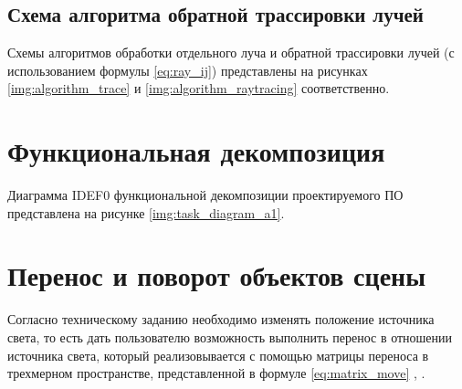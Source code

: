 



\clearpage

\subsection{Схема алгоритма обратной трассировки лучей}

Схемы алгоритмов обработки отдельного луча и обратной трассировки лучей (с использованием формулы \ref{eq:ray_ij}) представлены на рисунках \ref{img:algorithm_trace} и \ref{img:algorithm_raytracing} соответственно.



\clearpage

\section{Функциональная декомпозиция}

Диаграмма IDEF0 функциональной декомпозиции проектируемого ПО представлена на рисунке \ref{img:task_diagram_a1}.


\section{Перенос и поворот объектов сцены}

Согласно техническому заданию необходимо изменять положение источника света, то есть дать пользователю возможность выполнить перенос в отношении источника света, который реализовывается с помощью матрицы переноса в трехмерном пространстве, представленной в формуле \ref{eq:matrix_move} \cite{куров}, \cite{боресков}.

